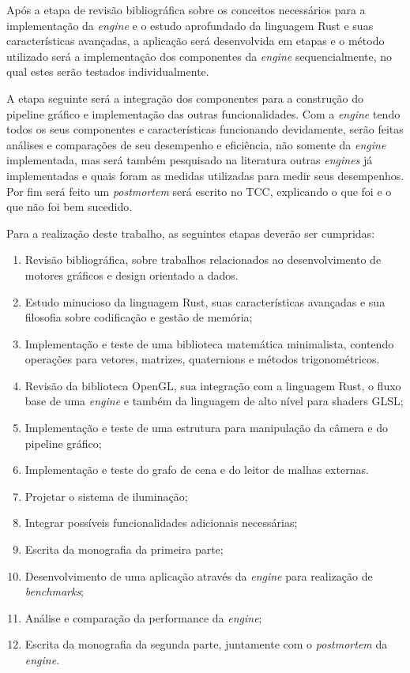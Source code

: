 \documentclass[11pt]{article}
\begin{document}
Após a etapa de revisão bibliográfica sobre 
os conceitos necessários para a implementação da \textit{engine} e o estudo aprofundado da linguagem Rust e suas 
características avançadas, a aplicação será desenvolvida em etapas e o método utilizado será a implementação
dos componentes da \textit{engine} sequencialmente, no qual estes serão testados individualmente.

A etapa seguinte será a integração dos componentes para a construção do pipeline gráfico e implementação 
das outras funcionalidades. Com a \textit{engine} tendo todos os seus componentes e características funcionando devidamente,
serão feitas análises e comparações de seu desempenho e eficiência, não somente da \textit{engine} implementada, mas será 
também pesquisado na literatura outras \textit{engines} já implementadas e quais foram as medidas utilizadas para medir seus 
desempenhos. Por fim será feito um \textit{postmortem} será escrito no TCC, explicando o que foi e o que não foi bem sucedido.

Para a realização deste trabalho, as seguintes etapas deverão ser cumpridas:

\begin{enumerate}[label=\textnormal{(\arabic*)}]
    \item Revisão bibliográfica, sobre trabalhos relacionados ao desenvolvimento de motores gráficos e design 
        orientado a dados.
    \item Estudo minucioso da linguagem Rust, suas características avançadas e sua filosofia sobre 
        codificação e gestão de memória;
    \item Implementação e teste de uma biblioteca matemática minimalista, contendo operações para vetores, 
        matrizes, quaternions e métodos trigonométricos.
    \item Revisão da biblioteca OpenGL, sua integração com a linguagem Rust, o fluxo base de uma 
        \textit{engine} e também da linguagem de alto nível para shaders GLSL;
    \item Implementação e teste de uma estrutura para manipulação da câmera e do pipeline gráfico;
    \item Implementação e teste do grafo de cena e do leitor de malhas externas.
    \item Projetar o sistema de iluminação;
    \item Integrar possíveis funcionalidades adicionais necessárias;
    \item Escrita da monografia da primeira parte;
    \item Desenvolvimento de uma aplicação através da \textit{engine} para realização de \textit{benchmarks};
    \item Análise e comparação da performance da \textit{engine};
    \item Escrita da monografia da segunda parte, juntamente com o \textit{postmortem} da \textit{engine}.
\end{enumerate}
\end{document}
